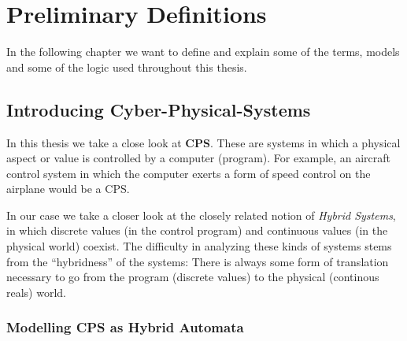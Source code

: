 

\chapter{Preliminary Definitions}
\label{ch:Preliminary}

In the following chapter we want to define and explain some of the terms, models and some of the logic used throughout this thesis. 

\section{Introducing Cyber-Physical-Systems}
\label{sec:pre:cps}

In this thesis we take a close look at \textbf{CPS}. These are systems in which a physical aspect or value is controlled by a computer (program). For example, an aircraft control system in which the computer exerts a form of speed control on the airplane would be a CPS. 

In our case we take a closer look at the closely related notion of \textit{Hybrid Systems}, in which discrete values (in the control program) and continuous values (in the physical world) coexist. The difficulty in analyzing these kinds of systems stems from the ``hybridness'' of the systems: There is always some form of translation necessary to go from the program (discrete values) to the physical (continous reals) world. 

\subsection{Modelling CPS as Hybrid Automata}

